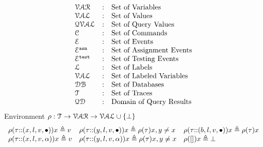 \[
\begin{array}{lll}
\mathcal{VAR} & : & \mbox{Set of Variables}  
\\ 
%
\mathcal{VAL} & : & \mbox{Set of Values} 
\\ 
%
\mathcal{QVAL} & : & \mbox{Set of Query Values} 
\\ 
%
\cdom & : & \mbox{Set of Commands} 
\\ 
%
\eventset  & : & \mbox{Set of Events}  
\\
%
\eventset^{\asn}  & : & \mbox{Set of Assignment Events}  
\\
%
\eventset^{\test}  & : & \mbox{Set of Testing Events}  
\\
%
\ldom  & : & \mbox{Set of Labels}  
\\
\mathcal{VAL}  & : & \mbox{Set of Labeled Variables}  
\\
\dbdom  & : & \mbox{{Set of Databases}} 
\\
%
{\mathcal{T}} & : & \mbox{Set of Traces}
\\
%
\qdom & : & \mbox{{Domain of Query Results}}\\
\end{array}
\]
%
%
%
Environment $ \rho : {\mathcal{T}}  \to \mathcal{VAR} \to \mathcal{VAL} \cup \{\bot\}$
\[
\begin{array}{lll}
\rho(\mathtt{\tau}  {\small ::} (x, l, v, \bullet)) x \triangleq v
&
\rho(\mathtt{\tau} {\small ::} (y, l, v, \bullet)) x \triangleq \rho(\mathtt{\tau}) x, y \neq x
&
\rho(\mathtt{\tau} {\small ::} (b, l, v, \bullet)) x \triangleq \rho(\mathtt{\tau}) x
\\
\rho(\mathtt{\tau} {\small ::} (x, l, v, \alpha)) x \triangleq v
&
\rho(\mathtt{\tau} {\small ::} (y, l, v, \alpha)) x \triangleq \rho(\mathtt{\tau}) x, y \neq x
&
\rho({[]} ) x \triangleq \bot
\end{array}
\]

